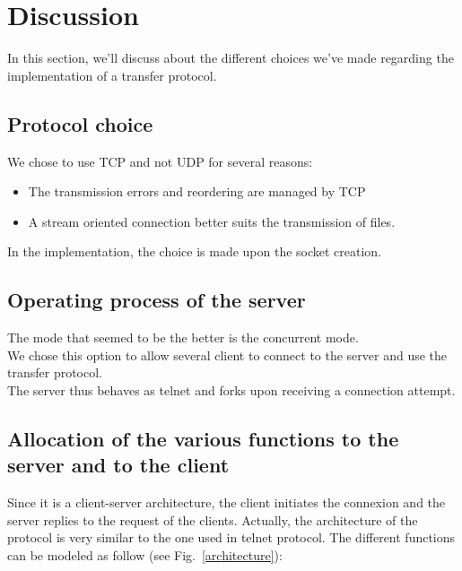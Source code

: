 \documentclass{article}
\begin{document}
\newpage


\section{Discussion}
In this section, we'll discuss about the different choices we've made regarding the implementation of a transfer protocol.

\subsection{Protocol choice}
We chose to use TCP and not UDP for several reasons:
\begin{itemize}
  \item The transmission errors and reordering are managed by TCP
  \item A stream oriented connection better suits the transmission of files.
\end{itemize}
In the implementation, the choice is made upon the socket creation.

\subsection{Operating process of the server}
The mode that seemed to be the better is the concurrent mode. \\
We chose this option to allow several client to connect to the server and use the transfer protocol.\\
The server thus behaves as telnet and forks upon receiving a connection attempt.

\subsection{Allocation of the various functions to the server and to the client}
Since it is a client-server architecture, the client initiates the connexion and the server replies to the request of the clients. 
Actually, the architecture of the protocol is very similar to the one used in telnet protocol.
The different functions can be modeled as follow (see Fig.~\ref{architecture}):
\end{document}
